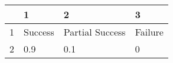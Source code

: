 \begin{table}[ht]
\centering
\begin{tabular}{rlll}
  \hline
 & 1 & 2 & 3 \\ 
  \hline
1 & Success & Partial Success & Failure \\ 
  2 & 0.9 & 0.1 & 0 \\ 
   \hline
\end{tabular}
\end{table}
